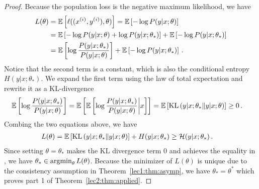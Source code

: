 


\begin{proof}
Because the population loss is the negative maximum likelihood, we have
\begin{align}
    L(\theta) &= \operatorname*{\mathbb{E}} \left[ \ell((x^{(i)}, y^{(i)}), \theta) \right] = \operatorname*{\mathbb{E}} \left[ - \log P(y \vert x; \theta) \right] \\
    &= \operatorname*{\mathbb{E}} \left[ - \log P(y \vert x; \theta) + \log P(y \vert x; \theta_*) \right] + \operatorname*{\mathbb{E}} \left[ - \log P(y \vert x; \theta_*) \right] \\
    &= \operatorname*{\mathbb{E}} \left[ \log \frac{P(y \vert x; \theta_*)}{P(y \vert x; \theta)} \right] + \operatorname*{\mathbb{E}} \left[ - \log P(y \vert x; \theta_*) \right]\,.
\end{align}
Notice that the second term is a constant, which is also the conditional entropy $H(y \vert x; \theta_*)$. We expand the first term using the law of total expectation and rewrite it as a KL-divergence
\begin{align}
 \Exp \left[ \log \frac{P(y \vert x; \theta_*)}{P(y \vert x; \theta)} \right] &= \Exp \left[ \Exp \left[ \log \frac{P(y \vert x; \theta_*)}{P(y \vert x; \theta)} \biggr\vert x \right] \right] = \Exp \left[ \KL \left( y \vert x; \theta_* \| y \vert x; \theta \right) \right] \ge 0 \perm%
\end{align}
Combing the two equations above, we have
\begin{align}
    L(\theta) &= \operatorname*{\mathbb{E}} \left[ \operatorname{KL} \left( y \vert x; \theta_* \| y \vert x; \theta \right) \right] + H(y \vert x; \theta_*) \geq \mathcal H(y \vert x; \theta_*)\,.\label{eqn:5}
\end{align}
Since setting $\theta = \theta_*$ makes the KL divergence term 0 and achieves the equality in , we have $\theta_* \in \operatorname*{\textup{argmin}}_\theta L(\theta)$. Because the minimizer of $L(\theta)$ is unique due to the consistency assumption in Theorem~\ref{lec1:thm:asymp}, we have $\theta_* = \theta^*$ which proves part 1 of Theorem~\ref{lec2:thm:applied}.


\end{proof}

